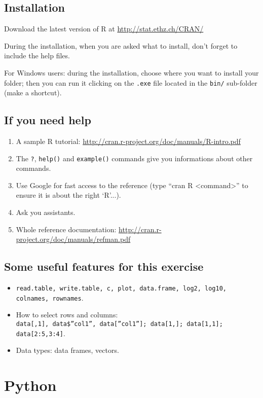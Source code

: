 \documentclass[a4paper,11pt]{article}
\begin{document}
\subsection{Installation}
Download the latest version of R at \url{http://stat.ethz.ch/CRAN/}

During the installation, when you are asked what to install, don't forget to include the help files.

For Windows users: during the installation, choose where you want to install your folder; then you can run it clicking on the \texttt{.exe} file located in the \texttt{bin/} sub-folder (make a shortcut).

\subsection{If you need help}
\begin{enumerate}
\item A sample R tutorial: \url{http://cran.r-project.org/doc/manuals/R-intro.pdf}
\item The \texttt{?}, \texttt{help()} and \texttt{example()} commands give you informations about other commands.
\item Use Google for fast access to the reference (type ``cran R <command>'' to ensure it is about the right `R'...).
\item Ask you assistants.
\item Whole reference documentation: \url{http://cran.r-project.org/doc/manuals/refman.pdf}
\end{enumerate}

\subsection{Some useful features for this exercise}
\begin{itemize}
\item \texttt{read.table, write.table, c, plot, data.frame, log2, log10, colnames, rownames}.
\item How to select rows and columns:\\ \texttt{data[,1], data\$''col1'', data[''col1'']; data[1,]; data[1,1]; data[2:5,3:4]}.
\item Data types: data frames, vectors.
\end{itemize}

\clearpage

\section{Python}
\end{document}
